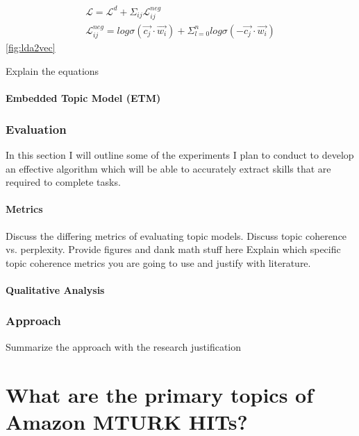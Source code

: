 \documentclass[letterpaper,12pt]{article}
\begin{document}
\begin{eqnarray}
	\label{eqn:lda2vec1}
		\mathcal{L} = \mathcal{L}^d +\Sigma_{ij} \mathcal{L}^{neg}_{ij}  \\
	\label{eqn:lda2vec2}
	\mathcal{L}^{neg}_{ij} = log \sigma (\vec{c_j} \cdot \vec{w_i}) + \Sigma^n_{l=0} log \sigma (-\vec{c_j} \cdot \vec{w_i})
\end{eqnarray}
\ref{fig:lda2vec}

Explain the equations


\newpage
\subsubsection{Embedded Topic Model (ETM)}
\subsection{Evaluation}
In this section I will outline some of the experiments I plan to conduct to develop an effective algorithm which
will be able to accurately extract skills that are required to complete tasks.

\subsubsection{Metrics}
Discuss the differing metrics of evaluating topic models. Discuss topic coherence vs. perplexity.
Provide figures and dank math stuff here
Explain which specific topic coherence metrics you are going to use and justify with literature.

\subsubsection{Qualitative Analysis}
\subsection{Approach}
Summarize the approach with the research justification

\chapter{What are the primary topics of Amazon MTURK HITs?}
\end{document}
